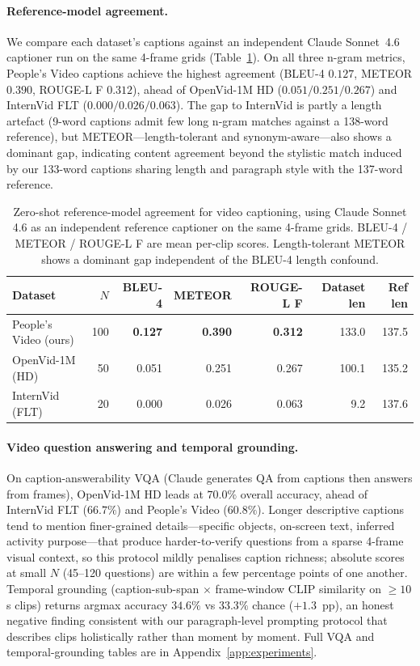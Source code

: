 \documentclass{article}
\begin{document}
\paragraph{Reference-model agreement.}
We compare each dataset's captions against an independent Claude Sonnet~4.6 captioner run on the same 4-frame grids (Table~\ref{tab:caption_quality}). On all three n-gram metrics, People's Video captions achieve the highest agreement (BLEU-4 $0.127$, METEOR $0.390$, ROUGE-L F $0.312$), ahead of OpenVid-1M HD ($0.051 / 0.251 / 0.267$) and InternVid FLT ($0.000 / 0.026 / 0.063$). The gap to InternVid is partly a length artefact (9-word captions admit few long n-gram matches against a 138-word reference), but METEOR---length-tolerant and synonym-aware---also shows a dominant gap, indicating content agreement beyond the stylistic match induced by our 133-word captions sharing length and paragraph style with the 137-word reference.

\begin{table}[t]
\centering
\caption{Zero-shot reference-model agreement for video captioning, using Claude Sonnet 4.6 as an independent reference captioner on the same 4-frame grids. BLEU-4 / METEOR / ROUGE-L F are mean per-clip scores. Length-tolerant METEOR shows a dominant gap independent of the BLEU-4 length confound.}
\label{tab:caption_quality}
\begin{tabular}{lrrrrrr}
\toprule
Dataset & $N$ & BLEU-4 & METEOR & ROUGE-L F & Dataset len & Ref len \\
\midrule
People's Video (ours) & 100 & \textbf{0.127} & \textbf{0.390} & \textbf{0.312} & 133.0 & 137.5 \\
OpenVid-1M (HD)       & 50  & 0.051          & 0.251          & 0.267          & 100.1 & 135.2 \\
InternVid (FLT)       & 20  & 0.000          & 0.026          & 0.063          & \phantom{00}9.2 & 137.6 \\
\bottomrule
\end{tabular}
\end{table}

\paragraph{Video question answering and temporal grounding.}
On caption-answerability VQA (Claude generates QA from captions then answers from frames), OpenVid-1M HD leads at $70.0\%$ overall accuracy, ahead of InternVid FLT ($66.7\%$) and People's Video ($60.8\%$). Longer descriptive captions tend to mention finer-grained details---specific objects, on-screen text, inferred activity purpose---that produce harder-to-verify questions from a sparse 4-frame visual context, so this protocol mildly penalises caption richness; absolute scores at small $N$ (45--120 questions) are within a few percentage points of one another. Temporal grounding (caption-sub-span $\times$ frame-window CLIP similarity on $\geq 10$\,s clips) returns argmax accuracy $34.6\%$ vs $33.3\%$ chance ($+1.3$~pp), an honest negative finding consistent with our paragraph-level prompting protocol that describes clips holistically rather than moment by moment. Full VQA and temporal-grounding tables are in Appendix~\ref{app:experiments}.
\end{document}

